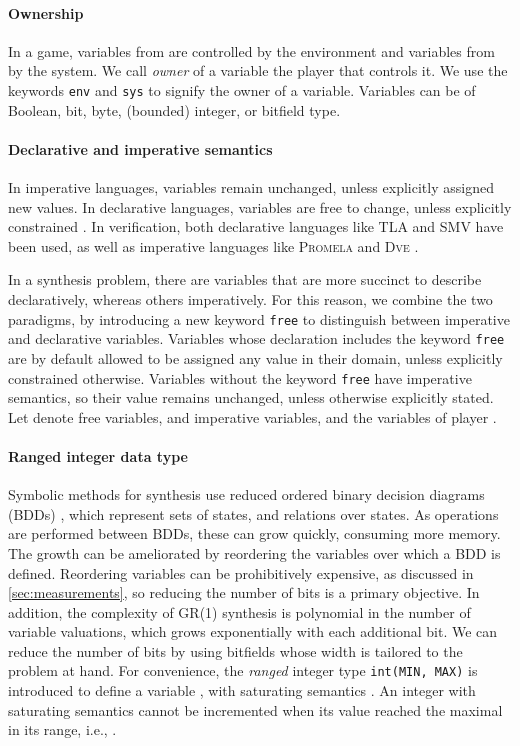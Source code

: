 \documentclass[copyright]{eptcs}
\begin{document}
\paragraph{Ownership}

In a game, variables from  are controlled by the environment and variables from  by the system.
We call {\em owner} of a variable the player that controls it.
We use the keywords \texttt{env} and \texttt{sys} to signify the owner of a variable.
Variables can be of Boolean, bit, byte, (bounded) integer, or bitfield type.


\paragraph{Declarative and imperative semantics}

In imperative languages, variables remain unchanged, unless explicitly assigned new values.
In declarative languages, variables are free to change, unless explicitly constrained \cite{vanRoy04}.
In verification, both declarative languages like \textsc{TLA} \cite{Lamport02} and \textsc{SMV} \cite{Cavada10nusmv} have been used, as well as imperative languages like \textsc{Promela} and \textsc{Dve} \cite{Barnat13cav}.

In a synthesis problem, there are variables that are more succinct to describe declaratively, whereas others imperatively.
For this reason, we combine the two paradigms, by introducing a new keyword \texttt{free} to distinguish between imperative and declarative variables.
Variables whose declaration includes the keyword \texttt{free} are by default allowed to be assigned any value in their domain, unless explicitly constrained otherwise.
Variables without the keyword \texttt{free} have imperative semantics, so their value remains unchanged, unless otherwise explicitly stated.
Let  denote free variables, and  imperative variables, and  the variables of player .


\paragraph{Ranged integer data type}

Symbolic methods for synthesis use reduced ordered binary decision diagrams (BDDs) \cite{Bryant86tc,Baier08}, which represent sets of states, and relations over states.
As operations are performed between BDDs, these can grow quickly, consuming more memory.
The growth can be ameliorated by reordering the variables over which a BDD is defined.
Reordering variables can be prohibitively expensive, as discussed in \cref{sec:measurements}, so reducing the number of bits is a primary objective.
In addition, the complexity of GR(1) synthesis is polynomial in the number  of variable valuations, which grows exponentially with each additional bit.
We can reduce the number of bits by using bitfields whose width is tailored to the problem at hand.
For convenience, the {\em ranged} integer type \texttt{int(MIN, MAX)} is introduced to define a variable , with saturating semantics \cite{Gennari07cmu}.
An integer with saturating semantics cannot be incremented when its value reached the maximal in its range, i.e., .
\end{document}
